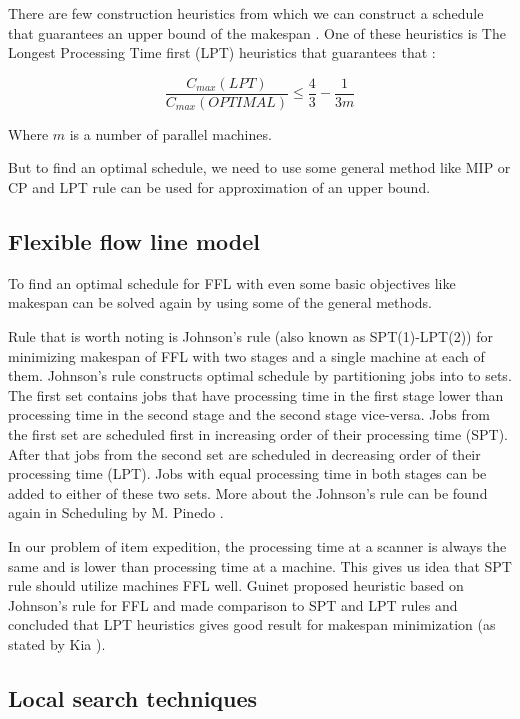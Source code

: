 \documentclass{ctuthesis}
\begin{document}
There are few construction heuristics from which we can construct a schedule that guarantees an upper bound of the makespan \cite{gram}. One of these heuristics is The Longest Processing Time first (LPT) heuristics \cite{pinedo} that guarantees that \cite{gram1969}:

\begin{equation}
\dfrac{C_{max}(LPT)}{C_{max}(OPTIMAL)} \leq \dfrac{4}{3} - \dfrac{1}{3m}
\end{equation}

Where $m$ is a number of parallel machines.

But to find an optimal schedule, we need to use some general method like MIP or CP and LPT rule can be used for approximation of an upper bound.

\subsection{Flexible flow line model}

To find an optimal schedule for FFL with even some basic objectives like makespan can be solved again by using some of the general methods. 

Rule that is worth noting is Johnson's rule (also known as SPT(1)-LPT(2)) for minimizing makespan of FFL with two stages and a single machine at each of them. Johnson's rule constructs optimal schedule by partitioning jobs into to sets. The first set contains jobs that have processing time in the first stage lower than processing time in the second stage and the second stage vice-versa. Jobs from the first set are scheduled first in increasing order of their processing time (SPT). After that jobs from the second set are scheduled in decreasing order of their processing time (LPT). Jobs with equal processing time in both stages can be added to either of these two sets. More about the Johnson's rule can be found again in Scheduling by M. Pinedo \cite{pinedo}.

In our problem of item expedition, the processing time at a scanner is always the same and is lower than processing time at a machine. This gives us idea that SPT rule should utilize machines FFL well. Guinet \cite{guinet} proposed heuristic based on Johnson's rule for FFL and made comparison to SPT and LPT rules and concluded that LPT heuristics gives good result for makespan minimization (as stated by Kia \cite{kia}).

\subsection{Local search techniques}
\end{document}
